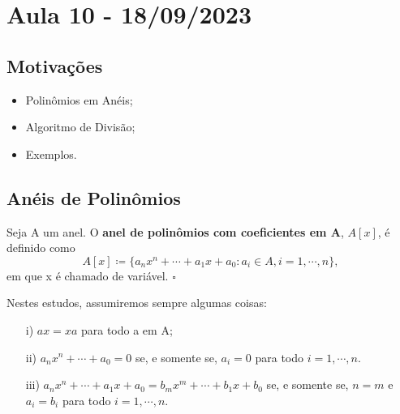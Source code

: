 \documentclass[algebraII_notes.tex]{subfiles}
\begin{document}
\section{Aula 10 - 18/09/2023}
\subsection{Motivações}
\begin{itemize}
	\item Polinômios em Anéis;
	\item Algoritmo de Divisão;
	\item Exemplos.
\end{itemize}
\subsection{Anéis de Polinômios}
\begin{def*}
	Seja A um anel. O \textbf{anel de polinômios com coeficientes em A}, \(A[x]\), é definido como
	\[
		A[x]\coloneqq \{a_{n}x^{n}+\cdots+a_{1}x + a_{0}: a_{i}\in A, i = 1, \cdots, n\},
	\]
	em que x é chamado de variável. \(\square\)
\end{def*}
Nestes estudos, assumiremos sempre algumas coisas:
\begin{itemize}
	\item[i)] \(ax = xa\) para todo a em A;
	\item[ii)] \(a_{n}x^{n} + \cdots + a_{0} = 0\) se, e somente se, \(a_{i} = 0\) para todo \(i=1, \cdots, n.\)
	\item[iii)] \(a_{n}x^{n} + \cdots + a_{1}x + a_{0} = b_{m}x^{m} + \cdots + b_{1}x + b_{0}\) se, e somente se, \(n=m\) e \(a_{i} = b_{i}\) para todo \(i=1, \cdots, n\).
\end{itemize}
\end{document}
